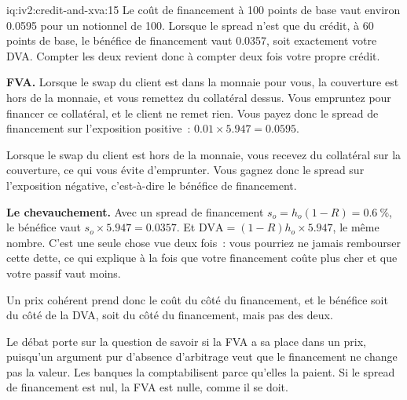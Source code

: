 \begin{solution}{iq:iv2:credit-and-xva:15}
Le coût de financement à 100 points de base vaut environ 0.0595 pour un notionnel de 100. Lorsque le spread n'est que du crédit, à 60 points de base, le bénéfice de financement vaut 0.0357, soit exactement votre DVA. Compter les deux revient donc à compter deux fois votre propre crédit.

\textbf{FVA.} Lorsque le swap du client est dans la monnaie pour vous, la couverture est hors de la monnaie, et vous remettez du collatéral dessus. Vous empruntez pour financer ce collatéral, et le client ne remet rien. Vous payez donc le spread de financement sur l'exposition positive~: $0.01 \times 5.947 = 0.0595$.

Lorsque le swap du client est hors de la monnaie, vous recevez du collatéral sur la couverture, ce qui vous évite d'emprunter. Vous gagnez donc le spread sur l'exposition négative, c'est-à-dire le bénéfice de financement.

\textbf{Le chevauchement.} Avec un spread de financement $s_o = h_o(1 - R) = 0.6~\%$, le bénéfice vaut $s_o \times 5.947 = 0.0357$. Et $\mathrm{DVA} = (1 - R)h_o \times 5.947$, le même nombre. C'est une seule chose vue deux fois~: vous pourriez ne jamais rembourser cette dette, ce qui explique à la fois que votre financement coûte plus cher et que votre passif vaut moins.

Un prix cohérent prend donc le coût du côté du financement, et le bénéfice soit du côté de la DVA, soit du côté du financement, mais pas des deux.

Le débat porte sur la question de savoir si la FVA a sa place dans un prix, puisqu'un argument pur d'absence d'arbitrage veut que le financement ne change pas la valeur. Les banques la comptabilisent parce qu'elles la paient. Si le spread de financement est nul, la FVA est nulle, comme il se doit.

\end{solution}

